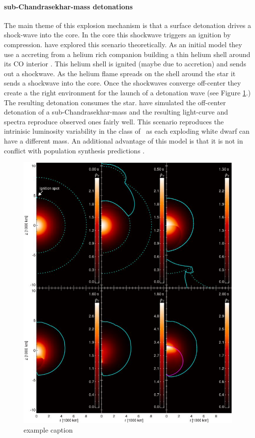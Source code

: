 \paragraph{sub-Chandrasekhar-mass detonations}
The main theme of this explosion mechanism is that a surface detonation drives a shock-wave into the core. In the core this shockwave triggers an ignition by compression. \citet{2010A&A...514A..53F} have explored this scenario theoretically. As an initial model they use a \cowd accreting from a helium rich companion building a thin helium shell around its CO interior \citep[described in][]{2007ApJ...662L..95B}. This helium shell is ignited (maybe due to accretion) and sends out a shockwave. As the helium flame spreads on the shell around the star it sends a shockwave into the core. Once 
the shockwaves converge off-center they create a the right environment for the launch of a detonation wave (see Figure \ref{fig:subch_fink2010}.) 
The resulting detonation consumes the star. \citet{2010ApJ...714L..52S} have simulated the off-center detonation of a sub-Chandrasekhar-mass \cowd and the resulting light-curve and spectra reproduce observed ones fairly well. 
This scenario reproduces the intrinisic luminosity variability in the class of \snia\ as each exploding white dwarf can have a different mass. An additional advantage of this model is that it is not in conflict with population synthesis predictions \citep{2009ApJ...699.2026R}.

\begin{figure}[htbp] %
   \centering
   \includegraphics[width=\textwidth]{chapter_intro/plots/subchandra_fink2010.pdf} 
   \caption{example caption}
   \label{fig:subch_fink2010}
\end{figure}

